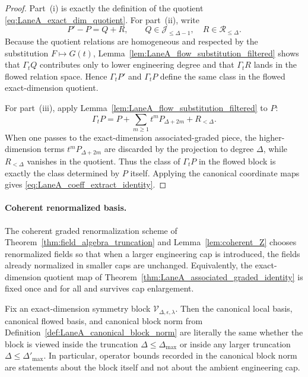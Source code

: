 \begin{proof}
Part~(i) is exactly the definition of the quotient \eqref{eq:LaneA_exact_dim_quotient}.
For part~(ii), write
\[
P'-P=Q+R,
\qquad
Q\in \mathscr J_{\le \Delta-1},\quad R\in \mathscr R_{\le \Delta}.
\]
Because the quotient relations are homogeneous and respected by the substitution $F\mapsto G(t)$,
Lemma~\ref{lem:LaneA_flow_substitution_filtered} shows that $\Gamma_tQ$ contributes only to lower engineering degree and that
$\Gamma_tR$ lands in the flowed relation space.
Hence $\Gamma_tP'$ and $\Gamma_tP$ define the same class in the flowed exact-dimension quotient.

For part~(iii), apply Lemma~\ref{lem:LaneA_flow_substitution_filtered} to $P$:
\[
\Gamma_tP=P+\sum_{m\ge 1} t^m P_{\Delta+2m}+R_{<\Delta}.
\]
When one passes to the exact-dimension associated-graded piece, the higher-dimension terms
$t^mP_{\Delta+2m}$ are discarded by the projection to degree $\Delta$, while $R_{<\Delta}$ vanishes in the quotient.
Thus the class of $\Gamma_tP$ in the flowed block is exactly the class determined by $P$ itself.
Applying the canonical coordinate maps gives \eqref{eq:LaneA_coeff_extract_identity}.
\end{proof}

\paragraph{Coherent renormalized basis.}
The coherent graded renormalization scheme of Theorem~\ref{thm:field_algebra_truncation} and Lemma~\ref{lem:coherent_Z}
chooses renormalized fields so that when a larger engineering cap is introduced, the fields already normalized in smaller caps are unchanged.
Equivalently, the exact-dimension quotient map of Theorem~\ref{thm:LaneA_associated_graded_identity} is fixed once and for all and survives cap enlargement.

\begin{lemma}\label{lem:LaneA_block_cap_compat}
Fix an exact-dimension symmetry block $\mathscr V_{\Delta,\epsilon,\lambda}$.
Then the canonical local basis, canonical flowed basis, and canonical block norm from Definition~\ref{def:LaneA_canonical_block_norm}
are literally the same whether the block is viewed inside the truncation $\Delta\le \Delta_{\max}$ or inside any larger truncation $\Delta\le \Delta'_{\max}$.
In particular, operator bounds recorded in the canonical block norm are statements about the block itself and not about the ambient engineering cap.
\end{lemma}


